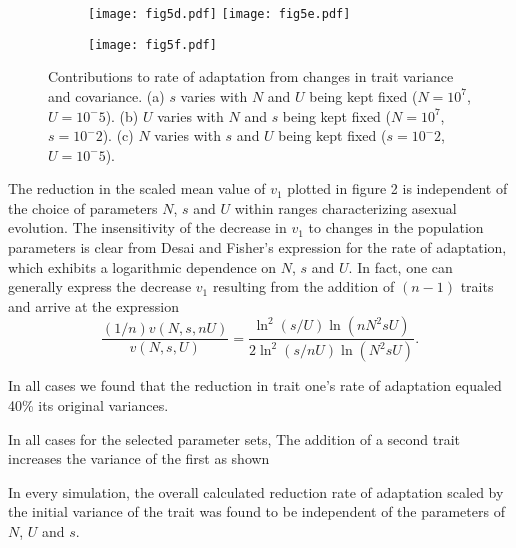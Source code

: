 \documentclass[11pt,twocolumn]{article}
\begin{document}
\begin{figure}[h]
\begin{subfigure}[b]{1\linewidth}
\texttt{[image: fig5d.pdf]}
\texttt{[image: fig5e.pdf]}
\end{subfigure}
\begin{subfigure}[b]{1\linewidth}
\centering
\texttt{[image: fig5f.pdf]}
\end{subfigure}
\label{fig}
\caption{\footnotesize Contributions to rate of adaptation from changes in trait variance and covariance. (a) $s$ varies with $N$ and $U$ being kept fixed ($N= 10^7$, $U=10^-5$). (b) $U$ varies with $N$ and $s$ being kept fixed ($N= 10^7$,$s=10^-2$). (c) $N$ varies with $s$ and $U$ being kept fixed ($s=10^-2$,$U=10^-5$).}
\end{figure}

The reduction in the scaled mean value of $v_1$ plotted in figure 2 is independent of the choice of parameters $N$, $s$ and $U$ within ranges characterizing asexual evolution. The insensitivity of the decrease in $v_1$ to changes in the population parameters is clear from Desai and Fisher's expression for the rate of adaptation, which exhibits a logarithmic dependence on $N$, $s$ and $U$. In fact, one can generally express the decrease $v_1$ resulting from the addition of $(n-1)$ traits and arrive at the expression   
\[
\frac{(1/n) v(N,s,nU)}{v(N,s,U)} 
= \frac{\ln^2(s/U)\ln(nN^2sU)}{2\ln^2(s/nU)\ln(N^2sU)}. 
\]





In all cases we found that the reduction in trait one's rate of adaptation equaled 40\% its original variances.  

In all cases for the selected parameter sets, The addition of a second trait increases the variance of the first as shown 

In every simulation, the overall calculated reduction rate of adaptation scaled by the initial variance of the trait was found to be independent of the parameters of $N$, $U$ and $s$. 
\end{document}
